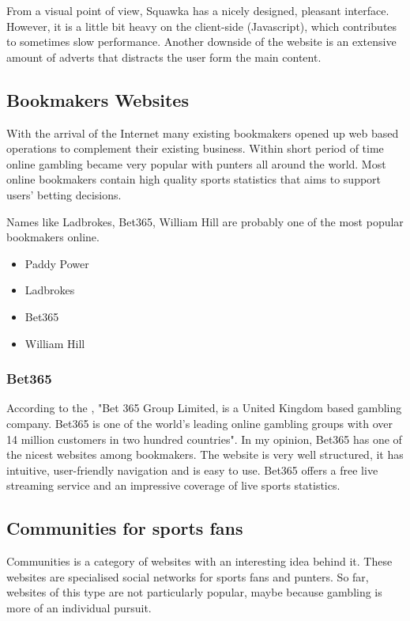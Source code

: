 From a visual point of view, Squawka has a nicely designed, pleasant interface. However, it is a little bit heavy on the client-side (Javascript), which contributes to sometimes slow performance. Another downside of the website is an extensive amount of adverts that distracts the user form the main content.
	
\subsection{Bookmakers Websites}
\label{subsec:bookmakerswebsites_req}
	
With the arrival of the Internet many existing bookmakers opened up web based operations to complement their existing business. Within short period of time online gambling became very popular with punters all around the world. Most online bookmakers contain high quality sports statistics that aims to support users' betting decisions.

Names like Ladbrokes, Bet365, William Hill are probably one of the most popular bookmakers online.

\begin{itemize}
	\item Paddy Power \citep{source:paddypower}
	\item Ladbrokes \citep{source:ladbrokes}
	\item Bet365 \citep{source:bet365}
	\item William Hill \citep{source:williamhill}
\end{itemize}

\subsubsection{Bet365}
\label{susubsec:bet365}

According to the \citet{wiki:bet365}, "Bet 365 Group Limited, is a United Kingdom based gambling company. Bet365 is one of the world’s leading online gambling groups with over 14 million customers in two hundred countries". In my opinion, Bet365 has one of the nicest websites among bookmakers. The website is very well structured, it has intuitive, user-friendly navigation and is easy to use. Bet365 offers a free live streaming service and an impressive coverage of live sports statistics.

\subsection{Communities for sports fans}
\label{subsec:communities_req}
Communities is a category of websites with an interesting idea behind it. These websites are specialised social networks for sports fans and punters. So far, websites of this type are not particularly popular, maybe because gambling is more of an individual pursuit.


